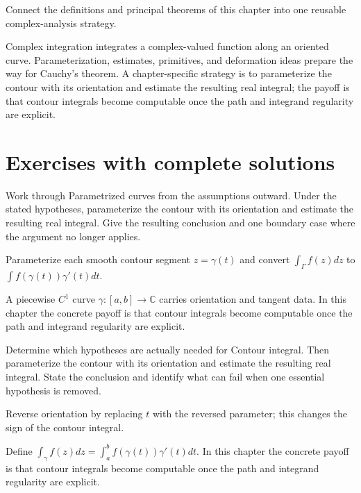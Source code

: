 \begin{problem}\label{prob:iv04-problem-12}
Connect the definitions and principal theorems of this chapter into one reusable complex-analysis strategy.
\end{problem}
\begin{solution}
Complex integration integrates a complex-valued function along an oriented curve. Parameterization, estimates, primitives, and deformation ideas prepare the way for Cauchy's theorem. A chapter-specific strategy is to parameterize the contour with its orientation and estimate the resulting real integral; the payoff is that contour integrals become computable once the path and integrand regularity are explicit.
\end{solution}

\section{Exercises with complete solutions}

\begin{exercise}\label{exr:iv04-01}
Work through Parametrized curves from the assumptions outward. Under the stated hypotheses, parameterize the contour with its orientation and estimate the resulting real integral. Give the resulting conclusion and one boundary case where the argument no longer applies.
\end{exercise}
\begin{hint}
Parameterize each smooth contour segment \(z=\gamma(t)\) and convert \(\int_\Gamma f(z)dz\) to \(\int f(\gamma(t))\gamma'(t)dt\).
\end{hint}
\begin{solution}
A piecewise $C^1$ curve $\gamma:[a,b]\to\mathbb C$ carries orientation and tangent data. In this chapter the concrete payoff is that contour integrals become computable once the path and integrand regularity are explicit.
\end{solution}

\begin{exercise}\label{exr:iv04-02}
Determine which hypotheses are actually needed for Contour integral. Then parameterize the contour with its orientation and estimate the resulting real integral. State the conclusion and identify what can fail when one essential hypothesis is removed.
\end{exercise}
\begin{hint}
Reverse orientation by replacing \(t\) with the reversed parameter; this changes the sign of the contour integral.
\end{hint}
\begin{solution}
Define $\int_\gamma f(z)dz=\int_a^bf(\gamma(t))\gamma'(t)dt$. In this chapter the concrete payoff is that contour integrals become computable once the path and integrand regularity are explicit.
\end{solution}

